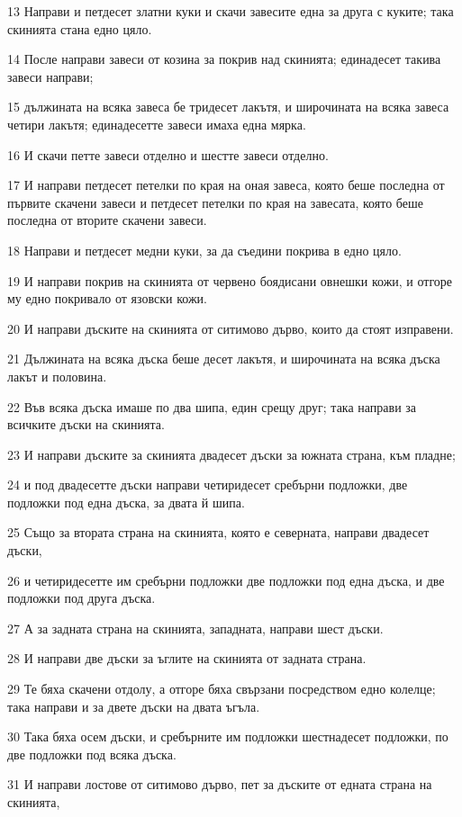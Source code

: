 \par 13 Направи и петдесет златни куки и скачи завесите една за друга с куките; така скинията стана едно цяло.
\par 14 После направи завеси от козина за покрив над скинията; единадесет такива завеси направи;
\par 15 дължината на всяка завеса бе тридесет лакътя, и широчината на всяка завеса четири лакътя; единадесетте завеси имаха една мярка.
\par 16 И скачи петте завеси отделно и шестте завеси отделно.
\par 17 И направи петдесет петелки по края на оная завеса, която беше последна от първите скачени завеси и петдесет петелки по края на завесата, която беше последна от вторите скачени завеси.
\par 18 Направи и петдесет медни куки, за да съедини покрива в едно цяло.
\par 19 И направи покрив на скинията от червено боядисани овнешки кожи, и отгоре му едно покривало от язовски кожи.
\par 20 И направи дъските на скинията от ситимово дърво, които да стоят изправени.
\par 21 Дължината на всяка дъска беше десет лакътя, и широчината на всяка дъска лакът и половина.
\par 22 Във всяка дъска имаше по два шипа, един срещу друг; така направи за всичките дъски на скинията.
\par 23 И направи дъските за скинията двадесет дъски за южната страна, към пладне;
\par 24 и под двадесетте дъски направи четиридесет сребърни подложки, две подложки под една дъска, за двата й шипа.
\par 25 Също за втората страна на скинията, която е северната, направи двадесет дъски,
\par 26 и четиридесетте им сребърни подложки две подложки под една дъска, и две подложки под друга дъска.
\par 27 А за задната страна на скинията, западната, направи шест дъски.
\par 28 И направи две дъски за ъглите на скинията от задната страна.
\par 29 Те бяха скачени отдолу, а отгоре бяха свързани посредством едно колелце; така направи и за двете дъски на двата ъгъла.
\par 30 Така бяха осем дъски, и сребърните им подложки шестнадесет подложки, по две подложки под всяка дъска.
\par 31 И направи лостове от ситимово дърво, пет за дъските от едната страна на скинията,
